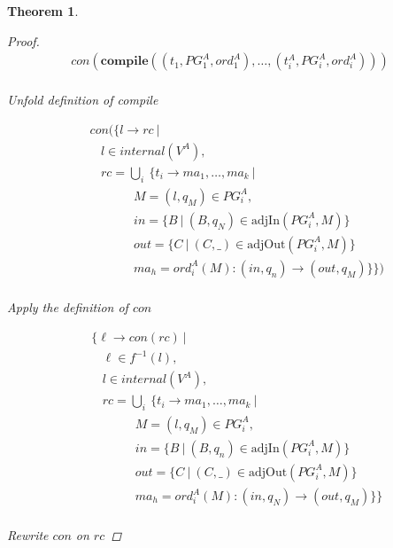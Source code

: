 \documentclass[twocolumn]{sig-alternate-10pt}
\newtheorem{thm}{Theorem}
\begin{document}
\begin{thm}
\begin{proof}
  \[ \begin{array}{l}
     con(\textbf{compile}( (t_1,PG^A_1,ord^A_1), \dots, (t^A_i,PG^A_i,ord^A_i) )) \\
  \end{array} \]%

Unfold definition of compile

  \[ \begin{array}{l}
     ~~~~~ con(\{ l \rightarrow rc ~\vert~ \\
     ~~~~~~~~~ l \in internal(V^A), \\
     ~~~~~~~~~ rc = \bigcup_i~ \{ t_i \rightarrow ma_1, \dots, ma_k ~\vert~ \\
     ~~~~~~~~~~~~~~~~~~~~~ M = (l,q_M) \in PG^A_i, \\
     ~~~~~~~~~~~~~~~~~~~~~ in = \{ B ~\vert~ (B,q_N) \in \text{adjIn}(PG^A_i,M) \} \\
     ~~~~~~~~~~~~~~~~~~~~~ out = \{ C ~\vert~ (C,\_) \in \text{adjOut}(PG^A_i,M) \} \\
     ~~~~~~~~~~~~~~~~~~~~~ ma_h = ord^A_i(M) : (in,q_n) \rightarrow (out,q_M) \} \}) \\
  \end{array} \]%

  Apply the definition of $con$

  \[ \begin{array}{l}
     ~~~~~ \{ \ell \rightarrow con(rc) ~\vert~ \\
     ~~~~~~~~~ \ell \in f^{-1}(l), \\
     ~~~~~~~~~ l \in internal(V^A), \\
     ~~~~~~~~~ rc = \bigcup_i~ \{ t_i \rightarrow ma_1, \dots, ma_k ~\vert~ \\
     ~~~~~~~~~~~~~~~~~~~~~ M = (l,q_M) \in PG^A_i, \\
     ~~~~~~~~~~~~~~~~~~~~~ in = \{ B ~\vert~ (B,q_n) \in \text{adjIn}(PG^A_i,M) \} \\
     ~~~~~~~~~~~~~~~~~~~~~ out = \{ C ~\vert~ (C,\_) \in \text{adjOut}(PG^A_i,M) \} \\
     ~~~~~~~~~~~~~~~~~~~~~ ma_h = ord^A_i(M) : (in,q_N) \rightarrow (out,q_M) \} \} \\
  \end{array} \]%

  Rewrite $con$ on $rc$


\end{proof}
\end{thm}
\end{document}
